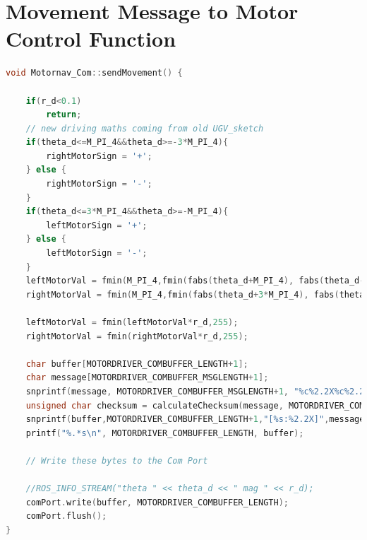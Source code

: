 \documentclass[titlepage,12pt,a4paper]{article}
\begin{document}
\section{Movement Message to Motor Control Function}
\begin{lstlisting}[language=C++]
void Motornav_Com::sendMovement() {

	if(r_d<0.1) 
		return;
	// new driving maths coming from old UGV_sketch
	if(theta_d<=M_PI_4&&theta_d>=-3*M_PI_4){
		rightMotorSign = '+';
	} else {
		rightMotorSign = '-';
	}
	if(theta_d<=3*M_PI_4&&theta_d>=-M_PI_4){
		leftMotorSign = '+';
	} else {
		leftMotorSign = '-';
	}
	leftMotorVal = fmin(M_PI_4,fmin(fabs(theta_d+M_PI_4), fabs(theta_d-3*M_PI_4)))*255/M_PI_4;
	rightMotorVal = fmin(M_PI_4,fmin(fabs(theta_d+3*M_PI_4), fabs(theta_d-M_PI_4)))*255/M_PI_4;
	
	leftMotorVal = fmin(leftMotorVal*r_d,255);
	rightMotorVal = fmin(rightMotorVal*r_d,255);
	
	char buffer[MOTORDRIVER_COMBUFFER_LENGTH+1];
	char message[MOTORDRIVER_COMBUFFER_MSGLENGTH+1];
	snprintf(message, MOTORDRIVER_COMBUFFER_MSGLENGTH+1, "%c%2.2X%c%2.2X", leftMotorSign, leftMotorVal, rightMotorSign, rightMotorVal);
	unsigned char checksum = calculateChecksum(message, MOTORDRIVER_COMBUFFER_MSGLENGTH);
	snprintf(buffer,MOTORDRIVER_COMBUFFER_LENGTH+1,"[%s:%2.2X]",message,checksum);
	printf("%.*s\n", MOTORDRIVER_COMBUFFER_LENGTH, buffer);
	
	// Write these bytes to the Com Port
	
	//ROS_INFO_STREAM("theta " << theta_d << " mag " << r_d);
	comPort.write(buffer, MOTORDRIVER_COMBUFFER_LENGTH);
	comPort.flush();
}
\end{lstlisting}
\end{document}

